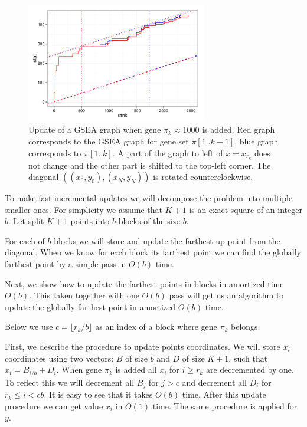 \documentclass[runningheads,a4paper]{llncs}
\begin{document}
\begin{figure}[h]
\begin{center}
\includegraphics[width=0.7\textwidth]{gsea_update.pdf}
\end{center}
\caption{
    Update of a GSEA graph when gene $\pi_k \approx 1000$ is 
    added. Red graph corresponds
    to the GSEA graph for gene set $\pi[1..k-1]$, 
    blue graph corresponds to $\pi[1..k]$.
    A part of the graph to left of $x=x_{r_k}$ does not change and 
    the other part is shifted to the top-left corner. The diagonal
    $\left((x_0, y_0), (x_N, y_N)\right)$ is rotated
    counterclockwise.
  }\label{fig_gsea_update}
\end{figure}

To make fast incremental updates we will decompose the problem into
multiple smaller ones. For simplicity we assume that $K+1$ is an exact
square of an integer $b$. Let split $K+1$ points into $b$ blocks of 
the size $b$.

For each of $b$ blocks we will store and update the farthest up point
from the diagonal. When we know for each block its farthest point
we can find the globally farthest point by a simple pass in $O(b)$ time.

Next, we show how to update the farthest points in blocks in amortized time
$O(b)$. This taken together with one $O(b)$ pass will get us an algorithm
to update the globally farthest point in amortized $O(b)$ time.

Below we use $c = \lfloor r_k / b \rfloor$ as an index of a block where gene
$\pi_k$ belongs.

First, we describe the procedure to update points coordinates. 
We will store $x_i$ coordinates using two vectors: $B$ of size $b$
and $D$ of size $K + 1$, such that $x_i = B_{i / b} + D_i$.
When gene $\pi_k$ is added all $x_i$ for $i \ge r_k$ are decremented by one.
To reflect this we will decrement all $B_j$ for $j > c$ and decrement
all $D_i$ for $r_k \le i < cb$. It is easy to see that it takes $O(b)$ 
time. After this update procedure we can get value $x_i$ in $O(1)$ time.
The same procedure is applied for $y$.
\end{document}
